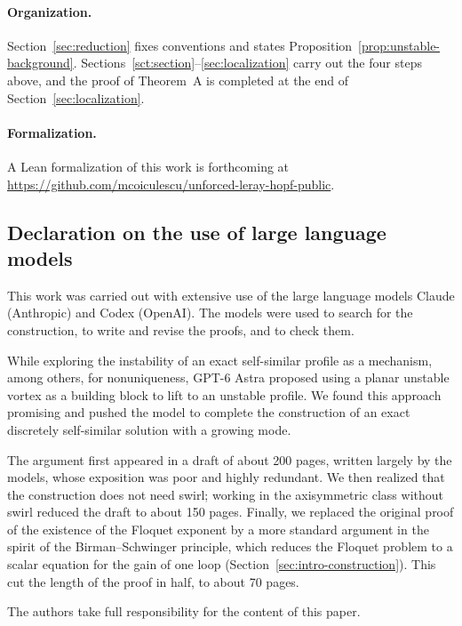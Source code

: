 \documentclass[11pt]{article}
\numberwithin{equation}{section}
\theoremstyle{definition}
\theoremstyle{remark}
\theoremstyle{plain}
\begin{document}
\paragraph{Organization.}
Section~\ref{sec:reduction} fixes conventions and states
Proposition~\ref{prop:unstable-background}. Sections~\ref{sct:section}--\ref{sec:localization} carry out the four steps above, and the proof of
Theorem~A is completed at the end of Section~\ref{sec:localization}.

\paragraph{Formalization.}
A Lean formalization of this work is forthcoming at
\url{https://github.com/mcoiculescu/unforced-leray-hopf-public}.

\subsection*{Declaration on the use of large language models}

This work was carried out with extensive use of the large language models
Claude (Anthropic) and Codex (OpenAI). The models were used to search for
the construction, to write and revise the proofs, and to check them.

While exploring the instability of an exact self-similar profile as a
mechanism, among others, for nonuniqueness, GPT-6 Astra proposed using a
planar unstable vortex as a building block to lift to an unstable
profile. We found this approach promising and pushed the model to
complete the construction of an exact discretely self-similar solution
with a growing mode.

The argument first appeared in a draft of about 200 pages, written largely
by the models, whose exposition was poor and highly redundant. We then
realized that the construction does not need swirl; working in the
axisymmetric class without swirl reduced the draft to about 150 pages.
Finally, we replaced the original proof of the existence of the Floquet
exponent by a more standard argument in the spirit of the Birman--Schwinger
principle, which reduces the Floquet problem to a scalar equation for the
gain of one loop (Section~\ref{sec:intro-construction}). This cut the
length of the proof in half, to about 70 pages.

The authors take full responsibility for the content of this paper.
\end{document}
